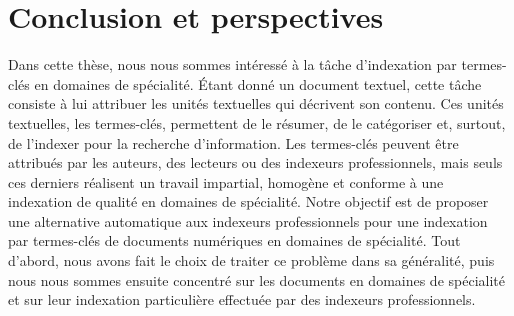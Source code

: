 \chapter{Conclusion et perspectives}
\label{chap:main-conclusion}

  Dans cette thèse, nous nous sommes intéressé à la tâche d'indexation par
  termes-clés en domaines de spécialité. Étant donné un document textuel, cette
  tâche consiste à lui attribuer les unités textuelles qui décrivent son
  contenu. Ces unités textuelles, les termes-clés, permettent de le résumer, de
  le catégoriser et, surtout, de l'indexer pour la recherche d'information. Les
  termes-clés peuvent être attribués par les auteurs, des lecteurs ou des
  indexeurs professionnels, mais seuls ces derniers réalisent un travail
  impartial, homogène et conforme à une indexation de qualité en domaines de
  spécialité. Notre objectif est de proposer une alternative automatique aux
  indexeurs professionnels pour une indexation par termes-clés de documents
  numériques en domaines de spécialité. Tout d'abord, nous avons fait le choix
  de traiter ce problème dans sa généralité, puis nous nous sommes ensuite
  concentré sur les documents en domaines de spécialité et sur leur indexation
  particulière effectuée par des indexeurs professionnels.

